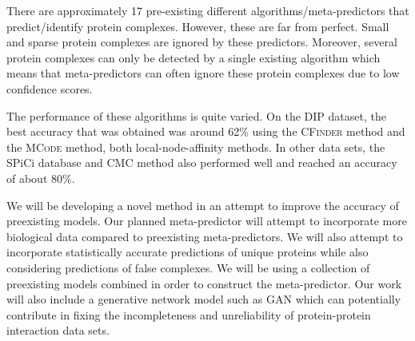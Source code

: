 \documentclass[11pt]{article}
\begin{document}
There are approximately 17 pre-existing different algorithms/meta-predictors that predict/identify protein complexes. However, 
these are far from perfect. Small and sparse protein complexes are ignored by these predictors. 
Moreover, several protein complexes can only be detected by a single existing algorithm which means that 
meta-predictors can often ignore these protein complexes due to low confidence scores. 

The performance of these algorithms is quite varied. On the DIP dataset, the best accuracy that was 
obtained was around 62\% using the \textsc{CFinder} method and the \textsc{MCode} method, both local-node-affinity 
methods. In other data sets, the SPiCi database and CMC method also performed well 
and reached an accuracy of about 80\%. 

We will be developing a novel method in an attempt to improve the accuracy of preexisting models. Our
planned meta-predictor will attempt to incorporate more biological data compared to preexisting
meta-predictors. We will also attempt to incorporate statistically accurate predictions of 
unique proteins while also considering predictions of false complexes. We will be using a collection 
of preexisting models combined in order to construct the meta-predictor. 
Our work will also include a generative network model such as GAN which can potentially 
contribute in fixing the incompleteness and unreliability of protein-protein interaction data sets.
\end{document}
